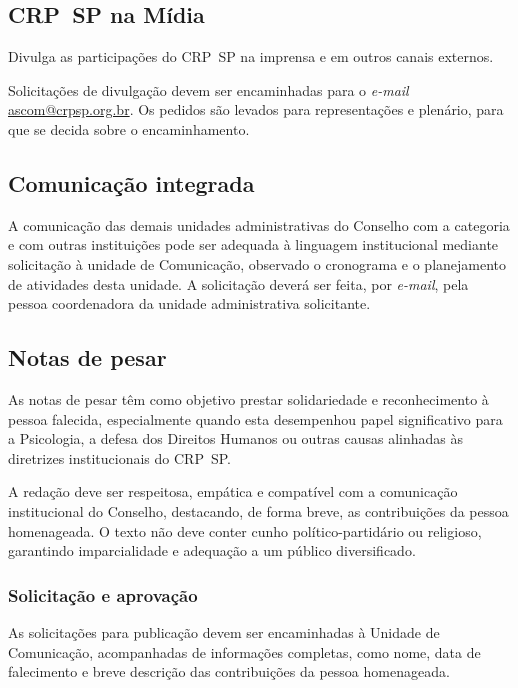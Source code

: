 \subsection{CRP~SP na Mídia}

Divulga as participações do CRP~SP na imprensa e em outros canais
externos.

Solicitações de divulgação devem ser encaminhadas para o \emph{e-mail}
\href{mailto:ascom@crpsp.org.br}{ascom@crpsp.org.br}. Os pedidos
são levados para representações e plenário, para que se decida sobre o
encaminhamento.

\subsection{Comunicação integrada}

A comunicação das demais unidades administrativas do Conselho com a
categoria e com outras instituições pode ser adequada à linguagem
institucional mediante solicitação à unidade de Comunicação, observado o
cronograma e o planejamento de atividades desta unidade. A solicitação
deverá ser feita, por \emph{e-mail}, pela pessoa coordenadora da unidade
administrativa solicitante.

\subsection{Notas de pesar}

As notas de pesar têm como objetivo prestar solidariedade e
reconhecimento à pessoa falecida, especialmente quando esta desempenhou
papel significativo para a Psicologia, a defesa dos Direitos Humanos ou
outras causas alinhadas às diretrizes institucionais do CRP~SP.

A redação deve ser respeitosa, empática e compatível com a comunicação
institucional do Conselho, destacando, de forma breve, as contribuições
da pessoa homenageada. O texto não deve conter cunho político-partidário
ou religioso, garantindo imparcialidade e adequação a um público
diversificado.

\subsubsection{Solicitação e
  aprovação}

As solicitações para publicação devem ser encaminhadas à Unidade de
Comunicação, acompanhadas de informações completas, como nome, data de
falecimento e breve descrição das contribuições da pessoa homenageada.


